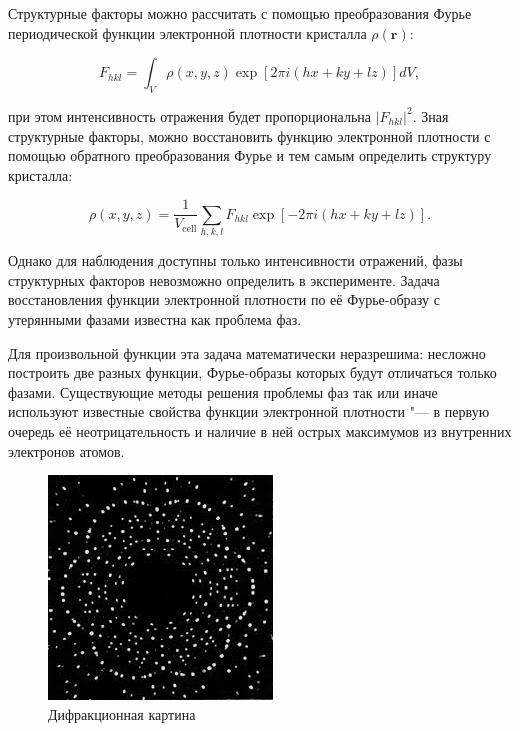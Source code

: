 \documentclass{article}
\begin{document}
Структурные факторы можно рассчитать с помощью преобразования Фурье периодической функции электронной плотности кристалла \(\rho(\mathbf{r})\):

\[
F_{hkl} = \int_{V}\rho(x,y,z) \exp \left[ 2\pi i (hx + ky + lz)\right] dV,
\]

при этом  интенсивность отражения будет пропорциональна \(|F_{hkl}|^{2}\). Зная структурные факторы, можно восстановить функцию электронной плотности с помощью обратного  преобразования Фурье и тем самым определить структуру кристалла:

\[
  \rho(x,y,z) = \frac{1}{V_{\mbox{cell}}} \sum_{h,k,l} F_{hkl}  \exp \left[ - 2\pi i (hx + ky + lz)\right].
\]

Однако для наблюдения доступны только интенсивности отражений, фазы структурных факторов невозможно определить в эксперименте. Задача  восстановления функции электронной плотности по её Фурье-образу с утерянными фазами известна как проблема фаз.

Для произвольной функции эта задача математически неразрешима: несложно построить две разных функции, Фурье-образы которых будут отличаться только фазами. Существующие методы решения проблемы фаз так или иначе используют известные свойства функции электронной плотности "--- в первую очередь её неотрицательность и наличие в ней острых максимумов из внутренних электронов атомов.

\begin{figure}[!htp]
  \includegraphics[width=\linewidth]{imgs/difr.jpeg}
  \caption{Дифракционная картина}
  \label{img:difr}
\end{figure}
\end{document}
